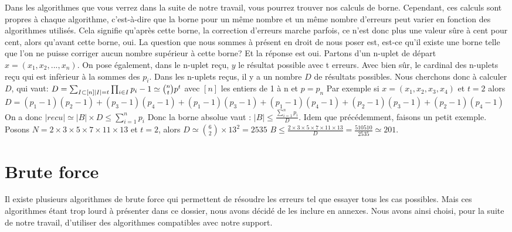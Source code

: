 \documentclass[a4paper, 11pt]{report}
\begin{document}
Dans les algorithmes que vous verrez dans la suite de notre travail, vous pourrez trouver nos calculs de borne. Cependant, ces calculs sont propres à chaque algorithme,
c'est-à-dire que la borne pour un même nombre et un même nombre d'erreurs peut varier en fonction des algorithmes utilisés. \newline
Cela signifie qu'après cette borne, la correction d'erreurs marche parfois, ce n'est donc plus une valeur sûre à cent pour cent, alors qu'avant cette borne, oui.
\newline
La question que nous sommes à présent en droit de nous poser est, est-ce qu'il existe une borne telle que l'on ne puisse corriger aucun nombre supérieur à cette borne? Et la réponse est oui.
Partons d'un n-uplet de départ $x=(x_1, x_2, ..., x_n)$. On pose également, dans le n-uplet reçu, $y$ le résultat possible avec t erreurs. Avec bien sûr, le cardinal des n-uplets reçu qui est infèrieur à la sommes des $p_i$. Dans les n-uplets reçus, il y a un nombre $D$ de résultats possibles. Nous cherchons donc à calculer $D$, qui vaut: \newline
$D=\sum_{I \subset  [n]  \newline |I|=t  }  \prod _{i \in I} p_i - 1 \simeq  \binom{n}{t} p^t  $ avec $[n]$ les entiers de 1 à n et $p=p_n$\newline
Par exemple si $x=(x_1, x_2, x_3, x_4)$ et $t=2$ alors $D=(p_1-1)(p_2-1)+(p_3-1)(p_4-1)+(p_1-1)(p_3-1)+(p_1-1)(p_4-1)+(p_2-1)(p_3-1)+(p_2-1)(p_4-1)$ \newline
On a donc $ |recu| \simeq |B| \times D\leq \sum_{i = 1}^{n} p_i  $ \newline
Donc la borne absolue vaut : $|B| \leq  \frac{\sum_{i= 1}^{n} p_i }{D} $.\newline
Idem que précédemment, faisons un petit exemple. \newline
Posons $N=2\times 3\times 5\times 7\times 11\times 13$ et $t=2$, alors $D\simeq \binom{6}{2}\times 13^2=2535$
$B \leq  \frac{2\times 3\times 5\times 7\times 11\times 13}{D}=\frac{510510}{2535} \simeq 201 $.


\newpage

\chapter{Brute force}

Il existe plusieurs algorithmes de brute force qui permettent de résoudre les erreurs tel que essayer tous les cas possibles. Mais ces algorithmes étant trop lourd à présenter dans ce dossier, nous avons décidé de les inclure en annexes.
Nous avons ainsi choisi, pour la suite de notre travail, d'utiliser des algorithmes compatibles avec notre support.
\end{document}
